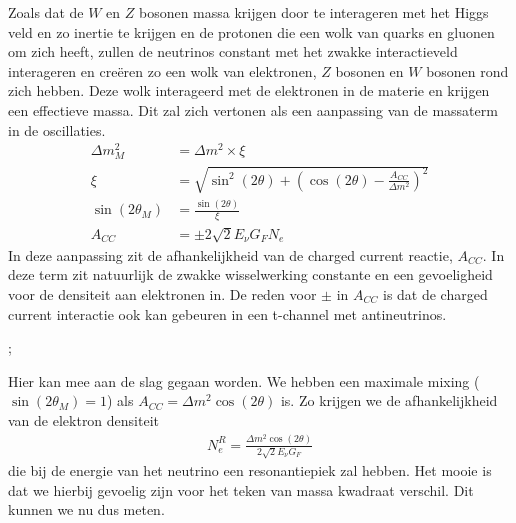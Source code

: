 \documentclass[../main.tex]{subfiles}
\begin{document}
Zoals dat de $W$ en $Z$ bosonen massa krijgen door te interageren met het Higgs veld en zo inertie te krijgen en de protonen die een wolk van quarks en gluonen om zich heeft, zullen de neutrinos constant met het zwakke interactieveld interageren en creëren zo een wolk van elektronen, $Z$ bosonen en $W$ bosonen rond zich hebben. Deze wolk interageerd met de elektronen in de materie en krijgen een effectieve massa. Dit zal zich vertonen als een aanpassing van de massaterm in de oscillaties.
\begin{equation}
    \begin{aligned}
        \label{eq:msw_effect}
        \Delta m_{M}^{2}&=\Delta m^{2} \times \xi\\
        \xi&=\sqrt{\sin ^{2}(2 \theta)+\left(\cos (2 \theta)-\frac{A_{C C}}{\Delta m^{2}}\right)^{2}}\\
        \sin \left(2 \theta_{M}\right)&=\frac{\sin (2 \theta)}{\xi}\\
        A_{C C}&=\pm 2 \sqrt{2} E_{\nu} G_{F} N_{e}
    \end{aligned}
\end{equation}
In deze aanpassing zit de afhankelijkheid van de charged current reactie, $A_{CC}$. In deze term zit natuurlijk de zwakke wisselwerking constante en een gevoeligheid voor de densiteit aan elektronen in. De reden voor $\pm$ in $A_{CC}$ is dat de charged current interactie ook kan gebeuren in een t-channel met antineutrinos.\\
\begin{center}
    ;
\end{center}
Hier kan mee aan de slag gegaan worden. We hebben een maximale mixing ($\sin \left(2 \theta_{M}\right)=1$) als $A_{C C}=\Delta m^{2} \cos (2 \theta)$ is. Zo krijgen we de afhankelijkheid van de elektron densiteit
\begin{equation}
    \begin{aligned}
        \label{eq:msw_elektron_densiteit}
        N_{e}^{R}=\frac{\Delta m^{2} \cos (2 \theta)}{2 \sqrt{2} E_{\nu} G_{F}}
    \end{aligned}
\end{equation}
die bij de energie van het neutrino een resonantiepiek zal hebben. Het mooie is dat we hierbij gevoelig zijn voor het teken van massa kwadraat verschil. Dit kunnen we nu dus meten.
\end{document}
